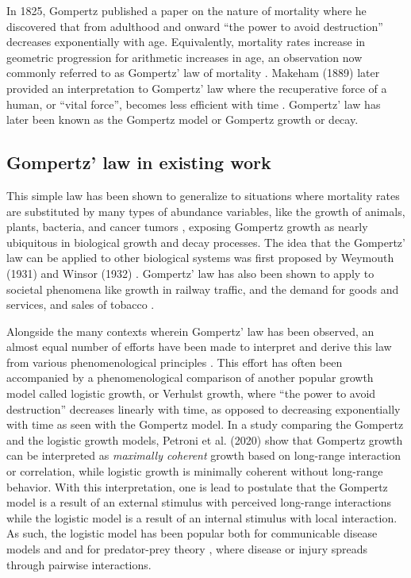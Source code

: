 \documentclass{article}
\begin{document}
In 1825, Gompertz published a paper on the nature of mortality where he discovered that from adulthood and onward ``the power to avoid destruction'' decreases exponentially with age. Equivalently, mortality rates increase in geometric progression for arithmetic increases in age, an observation now commonly referred to as Gompertz' law of mortality \cite{Gompertz1825}. Makeham (1889) later provided an interpretation to Gompertz' law where the recuperative force of a human, or ``vital force'', becomes less efficient with time \cite{makeham1889further}. Gompertz' law has later been known as the Gompertz model or Gompertz growth or decay. 

\subsection{Gompertz' law in existing work}
This simple law has been shown to generalize to situations where mortality rates are substituted by many types of abundance variables, like the growth of animals, plants, bacteria, and cancer tumors \cite{weymouth1931relative,weymouth1931age,laird1964dynamics,zwietering1990modeling,skinner1994mathematical,starck1998avian,aggrey2002comparison,paine2012fit,benzekry2014classical,halmi2014evaluation,tjorve2010shapes}, exposing Gompertz growth as nearly ubiquitous in biological growth and decay processes. The idea that the Gompertz' law can be applied to other biological systems was first proposed by Weymouth (1931) \cite{weymouth1931relative,weymouth1931age} and Winsor (1932) \cite{Winsor1932}. Gompertz' law has also been shown to apply to societal phenomena like growth in railway traffic, and the demand for goods and services, and sales of tobacco \cite{olshansky1997ever,prescott1922law,peabody1924growth}.

Alongside the many contexts wherein Gompertz' law has been observed, an almost equal number of efforts have been made to interpret and derive this law from various phenomenological principles \cite{bajzer1997mathematical}. This effort has often been accompanied by a phenomenological comparison of another popular growth model called logistic growth, or Verhulst growth, where ``the power to avoid destruction'' decreases linearly with time, as opposed to decreasing exponentially with time as seen with the Gompertz model. In a study comparing the Gompertz and the logistic growth models, Petroni et al. (2020) \cite{petroni2020logistic} show that Gompertz growth can be interpreted as \textit{maximally coherent} growth based on long-range interaction or correlation, while logistic growth is minimally coherent without long-range behavior. With this interpretation, one is lead to postulate that the Gompertz model is a result of an external stimulus with perceived long-range interactions while the logistic model is a result of an internal stimulus with local interaction. As such, the logistic model has been popular both for communicable disease models \cite{harko2014exact,kroger2020analytical,schlickeiser2021analytical,heng2020approximately} and and for predator-prey theory \cite{berryman1992orgins}, where disease or injury spreads through pairwise interactions. 
\end{document}
